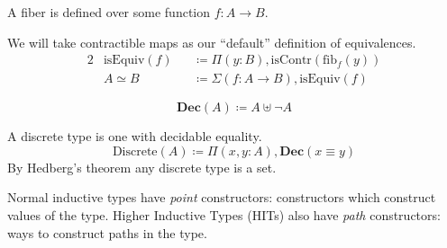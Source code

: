 \begin{definition}[Fibers] \label{fibers}
  A fiber \cite[definition 4.2.4]{hottbook} is defined over some function \(f :
  A \rightarrow B\).
  \begin{agdalisting}
  \end{agdalisting}
\end{definition}
\begin{definition}[Equivalences] \label{equivalences}
  We will take contractible maps \cite[definition 4.4.1]{hottbook} as our
  ``default'' definition of equivalences.
  \begin{alignat}{2}
    &\text{isEquiv}(f) &&\coloneqq \Pi(y : B) , \text{isContr}(\text{fib}_f(y)) \label{is-equiv-def} \\
    &A \simeq B        &&\coloneqq \Sigma(f : A \rightarrow B) , \text{isEquiv}(f) \label{equiv-def}
  \end{alignat}
\end{definition}
\begin{definition}
  \begin{equation}
    \mathbf{Dec}(A) \coloneqq A \uplus \neg A
  \end{equation}
\end{definition}
\begin{definition}
  A discrete type is one with decidable equality.
  \begin{equation}
    \text{Discrete}(A) \coloneqq \Pi(x, y : A) , \mathbf{Dec}(x \equiv y)
  \end{equation}
  By Hedberg's theorem \cite{hedbergCoherenceTheoremMartinLof1998} any discrete
  type is a set.
\end{definition}
\begin{definition} \label{HITs}
  Normal inductive types have \emph{point} constructors: constructors which
  construct values of the type.
  Higher Inductive Types (HITs) also have \emph{path} constructors: ways to
  construct paths in the type.
\end{definition}
